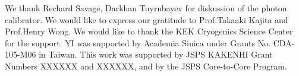 \documentclass[A4]{spie}  %
\begin{document}
We thank Rechard Savage, Darkhan Tuyrnbayev for diskussion of the photon calibrator. We would like to express our gratitude to Prof.Takaaki Kajita and Prof.Henry Wong. We would like to thank the KEK Cryogenics Science Center for the support. YI was supported by Academia Sinica under Grants No. CDA-105-M06 in Taiwan. This work was supported by JSPS KAKENHI Grant Numbers XXXXXX and XXXXXX, and by the JSPS Core-to-Core Program.


\end{document}
